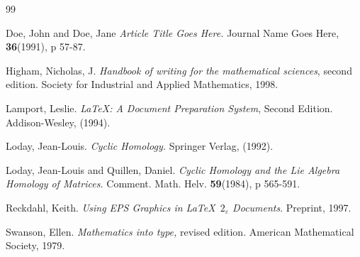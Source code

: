 \begin{thebibliography}{99}

 Doe, John  and Doe, Jane
{\em Article Title Goes Here.}
Journal Name Goes Here, {\bf 36}(1991), p 57-87.

Higham, Nicholas, J.  
{\em Handbook of writing for the mathematical sciences}, second edition.
Society for Industrial and Applied Mathematics, 1998.

 Lamport, Leslie.
{\em LaTeX:  A Document Preparation System}, Second Edition.
Addison-Wesley, (1994).

Loday, Jean-Louis.
{\em Cyclic Homology.}
Springer Verlag, (1992).

 Loday, Jean-Louis and Quillen, Daniel.
{\em Cyclic Homology and the Lie Algebra Homology of Matrices.}
Comment. Math. Helv. {\bf 59}(1984), p 565-591.

  Reckdahl, Keith.
{\em Using EPS Graphics in \LaTeX\ $2_{\varepsilon}$ Documents}.
Preprint, 1997.
 
  Swanson, Ellen.
{\em Mathematics into type,} revised edition.
American Mathematical Society, 1979.

\end{thebibliography}













